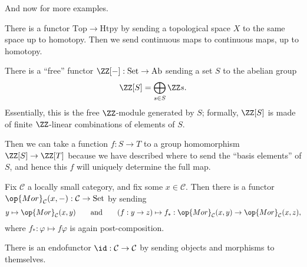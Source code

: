 \documentclass[../notes.tex]{subfiles}
\begin{document}
And now for more examples.
\begin{example}
	There is a functor $\mathrm{Top}\to\mathrm{Htpy}$ by sending a topological space $X$ to the same space up to homotopy. Then we send continuous maps to continuous maps, up to homotopy.
\end{example}
\begin{example}
	There is a ``free'' functor $\ZZ[-]:\mathrm{Set}\to\mathrm{Ab}$ sending a set $S$ to the abelian group
	\[\ZZ[S]=\bigoplus_{s\in S}\ZZ s.\]
	Essentially, this is the free $\ZZ$-module generated by $S$; formally, $\ZZ[S]$ is made of finite $\ZZ$-linear combinations of elements of $S$.

	Then we can take a function $f:S\to T$ to a group homomorphism $\ZZ[S]\to\ZZ[T]$ because we have described where to send the ``basis elements'' of $S$, and hence this $f$ will uniquely determine the full map.
\end{example}
\begin{example}
	Fix $\mathcal C$ a locally small category, and fix some $x\in\mathcal C$. Then there is a functor $\op{Mor}_\mathcal C(x,-):\mathcal C\to\mathrm{Set}$ by sending
	\[y\mapsto\op{Mor}_\mathcal C(x,y)\qquad\text{and}\qquad(f:y\to z)\mapsto f_*:\op{Mor}_\mathcal C(x,y)\to\op{Mor}_\mathcal C(x,z),\]
	where $f_*:\varphi\mapsto f\varphi$ is again post-composition.
\end{example}
\begin{example}
	There is an endofunctor $\id:\mathcal C\to\mathcal C$ by sending objects and morphisms to themselves.
\end{example}
\end{document}
